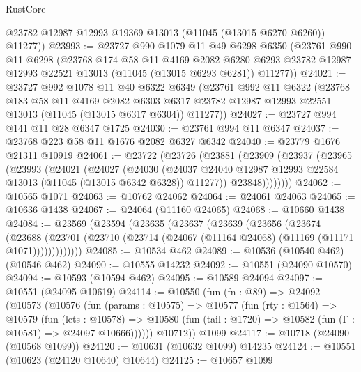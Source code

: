 \begin{lexlean}{RustCore}
\begin{coremodule}
        @23782
        @12987
        @12993
        @19369
        @13013
        (@11045 (@13015 @6270 @6260))
        @11277))
@23993 := @23727
    @990
    @1079
    @11
    @49
    @6298
    @6350
    (@23761
      @990
      @11
      @6298
      (@23768
        @174
        @58
        @11
        @4169
        @2082
        @6280
        @6293
        @23782
        @12987
        @12993
        @22521
        @13013
        (@11045 (@13015 @6293 @6281))
        @11277))
@24021 := @23727
    @992
    @1078
    @11
    @40
    @6322
    @6349
    (@23761
      @992
      @11
      @6322
      (@23768
        @183
        @58
        @11
        @4169
        @2082
        @6303
        @6317
        @23782
        @12987
        @12993
        @22551
        @13013
        (@11045 (@13015 @6317 @6304))
        @11277))
@24027 := @23727 @994 @141 @11 @28 @6347 @1725
@24030 := @23761 @994 @11 @6347
@24037 := @23768 @223 @58 @11 @1676 @2082 @6327 @6342
@24040 := @23779 @1676 @21311 @10919
@24061 := @23722
    (@23726
      (@23881
        (@23909
          (@23937
            (@23965
              (@23993
                (@24021
                  (@24027
                    (@24030
                      (@24037
                        @24040
                        @12987
                        @12993
                        @22584
                        @13013
                        (@11045 (@13015 @6342 @6328))
                        @11277))
                    @23848))))))))
@24062 := @10565 @1071
@24063 := @10762 @24062
@24064 := @24061 @24063
@24065 := @10636 @1438
@24067 := @24064 (@11160 @24065)
@24068 := @10660 @1438
@24084 := @23569
    (@23594
      (@23635
        (@23637
          (@23639
            (@23656
              (@23674
                (@23688
                  (@23701 (@23710 (@23714 (@24067 (@11164 @24068) (@11169 (@11171 @1071)))))))))))))
@24085 := @10534 @462
@24089 := @10536 (@10540 @462) (@10546 @462)
@24090 := @10555 @14232
@24092 := @10551 (@24090 @10570)
@24094 := @10593 (@10594 @462)
@24095 := @10589 @24094
@24097 := @10551 (@24095 @10619)
@24114 := @10550
    (fun (fn : @89) =>
    @24092
      (@10573
        (@10576
          (fun (params : @10575) =>
          @10577
            (fun (rty : @1564) =>
            @10579
              (fun (lets : @10578) =>
              @10580 (fun (tail : @1720) => @10582 (fun (Γ : @10581) => @24097 @10666))))))
        @10712))
    @1099
@24117 := @10718 (@24090 (@10568 @1099))
@24120 := @10631 (@10632 @1099) @14235
@24124 := @10551 (@10623 (@24120 @10640) @10644)
@24125 := @10657 @1099

\end{coremodule}
\end{lexlean}
